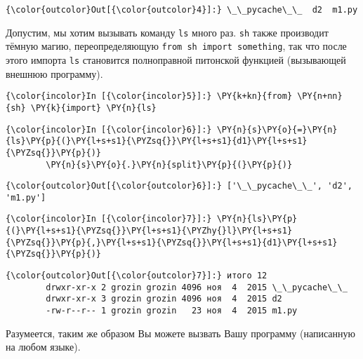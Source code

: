 \begin{Verbatim}[commandchars=\\\{\}]
{\color{outcolor}Out[{\color{outcolor}4}]:} \_\_pycache\_\_  d2  m1.py
\end{Verbatim}
            
    Допустим, мы хотим вызывать команду \texttt{ls} много раз. \texttt{sh}
также производит тёмную магию, переопределяющую
\texttt{from\ sh\ import\ something}, так что после этого импорта
\texttt{ls} становится полноправной питонской функцией (вызывающей
внешнюю программу).

    \begin{Verbatim}[commandchars=\\\{\}]
{\color{incolor}In [{\color{incolor}5}]:} \PY{k+kn}{from} \PY{n+nn}{sh} \PY{k}{import} \PY{n}{ls}
\end{Verbatim}


    \begin{Verbatim}[commandchars=\\\{\}]
{\color{incolor}In [{\color{incolor}6}]:} \PY{n}{s}\PY{o}{=}\PY{n}{ls}\PY{p}{(}\PY{l+s+s1}{\PYZsq{}}\PY{l+s+s1}{d1}\PY{l+s+s1}{\PYZsq{}}\PY{p}{)}
        \PY{n}{s}\PY{o}{.}\PY{n}{split}\PY{p}{(}\PY{p}{)}
\end{Verbatim}


\begin{Verbatim}[commandchars=\\\{\}]
{\color{outcolor}Out[{\color{outcolor}6}]:} ['\_\_pycache\_\_', 'd2', 'm1.py']
\end{Verbatim}
            
    \begin{Verbatim}[commandchars=\\\{\}]
{\color{incolor}In [{\color{incolor}7}]:} \PY{n}{ls}\PY{p}{(}\PY{l+s+s1}{\PYZsq{}}\PY{l+s+s1}{\PYZhy{}l}\PY{l+s+s1}{\PYZsq{}}\PY{p}{,}\PY{l+s+s1}{\PYZsq{}}\PY{l+s+s1}{d1}\PY{l+s+s1}{\PYZsq{}}\PY{p}{)}
\end{Verbatim}


\begin{Verbatim}[commandchars=\\\{\}]
{\color{outcolor}Out[{\color{outcolor}7}]:} итого 12
        drwxr-xr-x 2 grozin grozin 4096 ноя  4  2015 \_\_pycache\_\_
        drwxr-xr-x 3 grozin grozin 4096 ноя  4  2015 d2
        -rw-r--r-- 1 grozin grozin   23 ноя  4  2015 m1.py
\end{Verbatim}
            
    Разумеется, таким же образом Вы можете вызвать Вашу программу
(написанную на любом языке).
